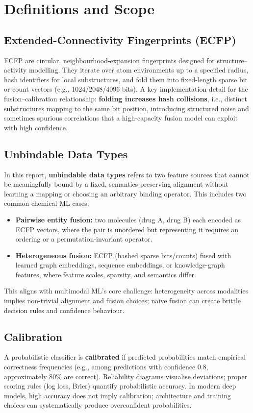 \documentclass[11pt,a4paper,twocolumn]{article}
\begin{document}
\section{Definitions and Scope}

\subsection{Extended-Connectivity Fingerprints (ECFP)}
ECFP are circular, neighbourhood-expansion fingerprints designed for
structure--activity modelling.
They iterate over atom environments up to a specified radius, hash
identifiers for local substructures, and fold them into fixed-length sparse
bit or count vectors (e.g., 1024/2048/4096 bits).
A key implementation detail for the fusion--calibration relationship:
\textbf{folding increases hash collisions}, i.e., distinct substructures
mapping to the same bit position, introducing structured noise and
sometimes spurious correlations that a high-capacity fusion model can
exploit with high confidence.

\subsection{Unbindable Data Types}
In this report, \textbf{unbindable data types} refers to two feature sources
that cannot be meaningfully bound by a fixed, semantics-preserving
alignment without learning a mapping or choosing an arbitrary binding
operator.
This includes two common chemical ML cases:
\begin{itemize}
\item \textbf{Pairwise entity fusion:} two molecules (drug A, drug B) each
      encoded as ECFP vectors, where the pair is unordered but representing
      it requires an ordering or a permutation-invariant operator.
\item \textbf{Heterogeneous fusion:} ECFP (hashed sparse bits/counts)
      fused with learned graph embeddings, sequence embeddings, or
      knowledge-graph features, where feature scales, sparsity, and
      semantics differ.
\end{itemize}
This aligns with multimodal ML's core challenge: heterogeneity across
modalities implies non-trivial alignment and fusion choices; naive fusion
can create brittle decision rules and confidence behaviour.

\subsection{Calibration}
A probabilistic classifier is \textbf{calibrated} if predicted
probabilities match empirical correctness frequencies (e.g., among
predictions with confidence 0.8, approximately 80\% are correct).
Reliability diagrams visualise deviations; proper scoring rules (log loss,
Brier) quantify probabilistic accuracy.
In modern deep models, high accuracy does not imply calibration;
architecture and training choices can systematically produce overconfident
probabilities.
\end{document}

